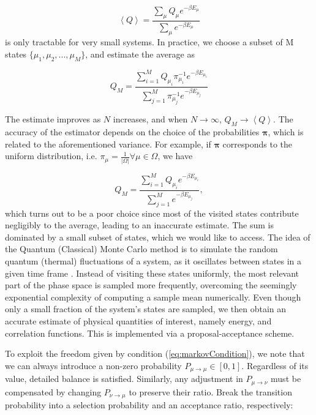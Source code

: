 \begin{equation}
\left\langle Q \right\rangle = \frac{ \sum_\mu Q_\mu e^{-\beta E_\mu} }{ \sum_\mu e^{-\beta E_\mu}}
\end{equation}
is only tractable for very small systems.
In practice, we choose a subset of M states $\{\mu_1, \mu_2, ..., \mu_M \} $, and estimate the average as

\begin{equation}
Q_M = \frac{ \sum_{i=1}^M Q_{\mu_i} \pi_{\mu_i}^{-1} e^{ -\beta E_{\mu_i} } }{ \sum_{j=1}^M \pi_{\mu_j}^{-1} e^{ -\beta E_{\mu_j} }  }
\end{equation}

The estimate improves as $N$ increases, and when $N\rightarrow \infty$, $Q_M \rightarrow \left\langle Q \right\rangle$.
The accuracy of the estimator depends on the choice of the probabilities $\bm \pi$, which is related to the aforementioned variance.
For example, if $\bm \pi$ corresponds to the uniform distribution, i.e. $\pi_\mu = \frac{1}{| \Omega |} \forall \mu \in \Omega$, we have

\begin{equation}
Q_M = \frac{ \sum_{i=1}^M Q_{\mu_i} e^{ -\beta E_{\mu_i} } }{ \sum_{j=1}^M e^{ -\beta E_{\mu_j} }  } ,
\end{equation}
which turns out to be a poor choice since most of the visited states contribute negligibly to the average, leading to an inaccurate estimate.
The sum is dominated by a small subset of states, which we would like to access.
The idea of the Quantum (Classical) Monte Carlo method is to simulate the random quantum (thermal) fluctuations of a system, as it oscillates between states in a given time frame \cite{newman_monte_1999}. Instead of visiting these states uniformly, the most relevant part of the phase space is sampled more frequently, overcoming the seemingly exponential complexity of computing a sample mean numerically.
Even though only a small fraction of the system's states are sampled, we then obtain an accurate estimate of physical quantities of interest, namely energy, and correlation functions. This is implemented via a proposal-acceptance scheme.

To exploit the freedom given by condition (\ref{eq:markovCondition}), we note that we can always introduce a non-zero  probability $P_{\mu \rightarrow \mu} \in [0, 1] $.
Regardless of its value, detailed balance is satisfied.
Similarly, any adjustment in $P_{\mu\rightarrow \nu}$ must be compensated by changing $P_{\nu\rightarrow \mu}$ to preserve their ratio.
Break the transition probability into a selection probability and an acceptance ratio, respectively:

